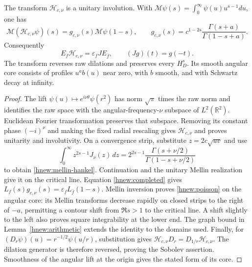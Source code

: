 \begin{lemma}\label{hnew:transform}
The transform $\mathcal H_{c,\nu}$ is a unitary involution.  With
$\mathcal M\psi(s)=\int_0^\infty\psi(u)u^{s-1}du$, one has
\begin{equation}\label{hnew:mellin-hankel}
 \mathcal M(\mathcal H_{c,\nu}\psi)(s)
  =g_{c,\nu}(s)\mathcal M\psi(1-s),\qquad
 g_{c,\nu}(s)=c^{1-2s}
      \frac{\Gamma(s+a)}{\Gamma(1-s+a)}.
\end{equation}
Consequently
\begin{equation}\label{hnew:poisson}
 E_f\mathcal H_{c,\nu}=\varepsilon_f J E_{\bar f},\qquad
 (Jg)(t)=g(-t).
\end{equation}
The transform reverses raw dilations and preserves every $H_D^s$.
Its smooth angular core consists of profiles $u^ab(u)$ near zero,
with $b$ smooth, and with Schwartz decay at infinity.
\end{lemma}
\begin{proof}
The lift $\psi(u)\mapsto e^{i\nu\theta}\psi(r^2)$ has norm
$\sqrt\pi$ times the raw norm and identifies the raw space with
the angular-frequency-$\nu$ subspace of $L^2(\mathbb R^2)$.
Euclidean Fourier transformation preserves that subspace.  Removing
its constant phase $(-i)^\nu$ and making the fixed radial rescaling
gives $\mathcal H_{c,\nu}$ and proves unitarity and involutivity.
On a convergence strip, substitute $z=2c\sqrt{uv}$ and use
\[
 \int_0^\infty z^{2s-1}J_\nu(z)\,dz
     =2^{2s-1}\frac{\Gamma(s+\nu/2)}{\Gamma(1-s+\nu/2)}
\]
to obtain \eqref{hnew:mellin-hankel}.  Continuation and the unitary
Mellin realization give it on the critical line.
Equation \eqref{hnew:completed} gives
$L_f(s)g_{c,\nu}(s)=\varepsilon_fL_{\bar f}(1-s)$.
Mellin inversion proves \eqref{hnew:poisson} on the angular core:
its Mellin transforms decrease rapidly on closed strips to the
right of $-a$, permitting a contour shift from $\Re s>1$ to
the critical line.  A shift slightly to the left also proves
square integrability at the lower end.  The graph bound in
Lemma~\ref{hnew:arithmetic} extends the identity to the domains used.
Finally, for $(D_r\psi)(u)=r^{-1/2}\psi(u/r)$, substitution gives
$\mathcal H_{c,\nu}D_r=D_{1/r}\mathcal H_{c,\nu}$.
The dilation generator is therefore reversed, proving the Sobolev
assertion.  Smoothness of the angular lift at the origin gives
the stated form of its core.
\end{proof}
